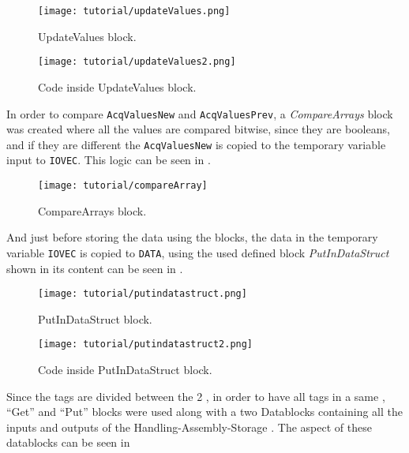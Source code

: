 \begin{figure}[H] \centering
 \texttt{[image: tutorial/updateValues.png]}
  \caption{UpdateValues block.}
  \label{fig:updateValuesBlock}
\end{figure}

\begin{figure}[H] \centering
 \texttt{[image: tutorial/updateValues2.png]}
  \caption{Code inside UpdateValues block.}
  \label{fig:updateValuesBlockCode}
\end{figure}

In order to compare \verb|AcqValuesNew| and \verb|AcqValuesPrev|, a
\emph{CompareArrays} block was created where all the values are compared
bitwise, since they are booleans, and if they are different the
\verb|AcqValuesNew| is copied to the temporary variable input to \verb|IOVEC|.
This logic can be seen in .

\begin{figure}[H] \centering
 \texttt{[image: tutorial/compareArray]}
  \caption{CompareArrays block.}
  \label{fig:compareArrayBlock}
\end{figure}

And just before storing the data using the blocks, the data in the temporary
variable \verb|IOVEC| is copied to \verb|DATA|, using the used defined block
\emph{PutInDataStruct} shown in  its content
can be seen in .  

\begin{figure}[H] \centering
 \texttt{[image: tutorial/putindatastruct.png]}
  \caption{PutInDataStruct block.}
  \label{fig:putInDataStructBlock}
\end{figure}

\begin{figure}[H] \centering
 \texttt{[image: tutorial/putindatastruct2.png]}
  \caption{Code inside PutInDataStruct block.}
  \label{fig:putInDataStructBlockCode}
\end{figure}

\begin{observation}
  Since the tags are divided between the 2 \PLCs{}, in order to have all tags in
  a same \PLC, ``Get'' and ``Put'' blocks were used along with a two Datablocks
  containing all the inputs and outputs of the Handling-Assembly-Storage \PLC.
  The aspect of these datablocks can be seen in 
\end{observation}

